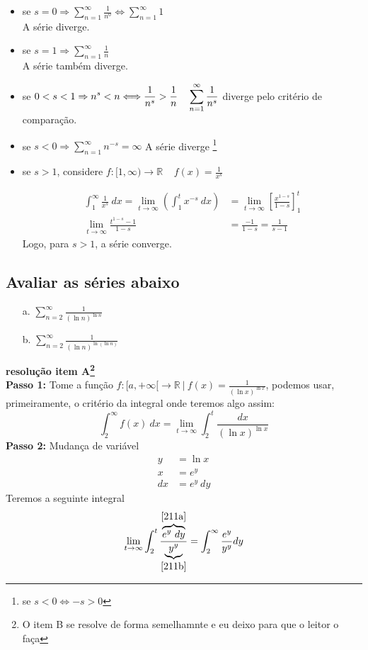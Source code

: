 \documentclass[12pt,openany]{book}
\begin{document}
\begin{itemize}
\item se $\displaystyle{s = 0} \Rightarrow \sum_{n = 1}^{\infty} \frac{1}{n^0} \Longleftrightarrow \sum_{n = 1}^{\infty} 1$ \\ A série diverge.
\item se $\displaystyle{s = 1} \Rightarrow \sum_{n = 1}^{\infty} \frac{1}{n}$ \\ A série também diverge.
\item se $\displaystyle{0 < s < 1 \Rightarrow n^s < n \Longleftrightarrow \frac{1}{n^s} > \frac{1}{n} \ \ \ \vspace{5mm} \sum_{n = 1}^{\infty} \frac{1}{n^s}}$ diverge pelo critério de comparação.
\item se $\displaystyle{s < 0} \Rightarrow \sum_{n = 1}^{\infty} n^{-s} = \infty$ A série diverge \footnote{se $s < 0 \Longleftrightarrow -s > 0$}
\item se $s > 1$, considere $f: [1, \infty) \rightarrow \mathds{R} \ \ \ \ \ f(x) = \frac{1}{x^s}$

\begin{align*}
\int_1^{\infty} \frac{1}{x^s} \ dx = \lim_{t \rightarrow \infty} \left(\int_1^t x^{-s} \ dx \right) &= \lim_{t \rightarrow \infty} \left[\frac{x^{1-s}}{1-s} \right]_1^t \\
\lim_{t \rightarrow \infty} \frac{t^{1-s}-1}{1-s} &= \frac{-1}{1-s} = \frac{1}{s-1}
\end{align*}
Logo, para $s > 1$, a série converge.
\end{itemize}

\subsection*{Avaliar as séries abaixo}
\begin{itemize}
\item [a.] $\displaystyle{\sum_{n=2}^{\infty} \frac{1}{(\ln n)^{\ln n}}}$ 
\item [b.] $\displaystyle{\sum_{n=2}^{\infty} \frac{1}{(\ln n)^{\ln(\ln n)}}}$
\end{itemize}
\textbf{resolução item A\footnote{O item B se resolve de forma semelhamnte e eu deixo para que o leitor o faça}}
\\
\textbf{Passo 1:} Tome a função $f:[a, +\infty[ \rightarrow \mathds{R} \ | \  f(x) = \displaystyle{\frac{1}{(\ln x)^{\ln x}}}$, podemos usar, primeiramente, o critério da integral onde teremos algo assim: $$\int_2^{\infty} f(x) \ dx = \lim_{t \rightarrow \infty} \int_2^t \displaystyle{\frac{dx}{(\ln x)^{\ln x}}}$$
\textbf{Passo 2:} Mudança de variável
\begin{align}
y &= \ln x \\ \label{211a}
x &= e^y \\ 
dx &= e^y \ dy \label{211b}
\end{align}
Teremos a seguinte integral $$\lim_{t \rightarrow \infty} \int_2^t \displaystyle{\frac{\overbrace{e^y \ dy}^{\ref{211a}}}{\underbrace{y^y}_{\ref{211b}}}} = \int_2^{\infty} \frac{e^y}{y^y} dy$$
\end{document}

